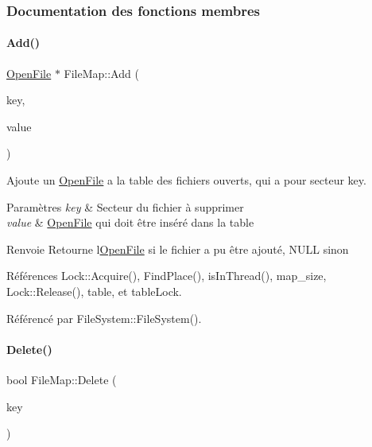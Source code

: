 \subsubsection{Documentation des fonctions membres}
\hypertarget{class_file_map_acf17cb5b602e4139ed3d30c11e11751f}{}\label{class_file_map_acf17cb5b602e4139ed3d30c11e11751f} 
\paragraph{\texorpdfstring{Add()}{Add()}}
{\footnotesize\ttfamily \hyperlink{class_open_file}{Open\+File} $\ast$ File\+Map\+::\+Add (\begin{DoxyParamCaption}\item[{int}]{key,  }\item[{\hyperlink{class_open_file}{Open\+File} $\ast$}]{value }\end{DoxyParamCaption})}



Ajoute un \hyperlink{class_open_file}{Open\+File} a la table des fichiers ouverts, qui a pour secteur key. 


\begin{DoxyParams}{Paramètres}
{\em key} & Secteur du fichier à supprimer \\
\hline
{\em value} & \hyperlink{class_open_file}{Open\+File} qui doit être inséré dans la table \\
\hline
\end{DoxyParams}
\begin{DoxyReturn}{Renvoie}
Retourne l\textquotesingle{}\hyperlink{class_open_file}{Open\+File} si le fichier a pu être ajouté, N\+U\+LL sinon 
\end{DoxyReturn}


Références Lock\+::\+Acquire(), Find\+Place(), is\+In\+Thread(), map\+\_\+size, Lock\+::\+Release(), table, et table\+Lock.



Référencé par File\+System\+::\+File\+System().

\hypertarget{class_file_map_ab6d2e0d0c522ed4f6bcd9c7788db8ac5}{}\label{class_file_map_ab6d2e0d0c522ed4f6bcd9c7788db8ac5} 
\paragraph{\texorpdfstring{Delete()}{Delete()}}
{\footnotesize\ttfamily bool File\+Map\+::\+Delete (\begin{DoxyParamCaption}\item[{int}]{key }\end{DoxyParamCaption})}



